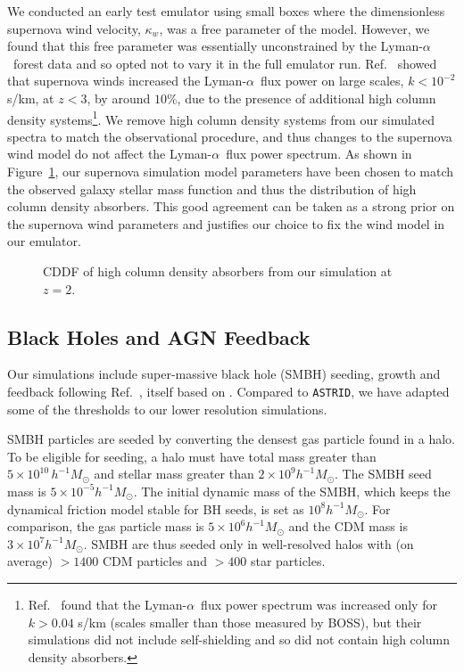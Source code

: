 \documentclass[a4paper,11pt]{article}
\newcommand{\Lya}{Lyman-$\alpha$}
\newcommand{\astrid}{\texttt{ASTRID}}
\begin{document}
We conducted an early test emulator using small boxes where the dimensionless supernova wind velocity, $\kappa_w$, was a free parameter of the model. However, we found that this free parameter was essentially unconstrained by the \Lya~forest data and so opted not to vary it in the full emulator run. Ref.~\cite{Bolton:2017} showed that supernova winds increased the \Lya~flux power on large scales, $k < 10^{-2}$ s/km, at $z < 3$, by around $10\%$, due to the presence of additional high column density systems\footnote{Ref.~\cite{Viel:2013} found that the \Lya~flux power spectrum was increased only for $ k > 0.04$ s/km (scales smaller than those measured by BOSS), but their simulations did not include self-shielding and so did not contain high column density absorbers.}. We remove high column density systems from our simulated spectra to match the observational procedure, and thus changes to the supernova wind model do not affect the \Lya~flux power spectrum. As shown in Figure~\ref{fig:DLACDDF}, our supernova simulation model parameters have been chosen to match the observed galaxy stellar mass function and thus the distribution of high column density absorbers. This good agreement can be taken as a strong prior on the supernova wind parameters and justifies our choice to fix the wind model in our emulator.

\begin{figure}
 \caption{CDDF of high column density absorbers from our simulation at $z=2$.}
 \label{fig:DLACDDF}
\end{figure}

\subsection{Black Holes and AGN Feedback}
\label{sec:agn}

Our simulations include super-massive black hole (SMBH) seeding, growth and feedback following Ref.~\cite{Ni:2022}, itself based on \cite{Feng:2016,SDH2005,DSH2005}. Compared to \astrid, we have adapted some of the thresholds to our lower resolution simulations.

SMBH particles are seeded by converting the densest gas particle found in a halo. To be eligible for seeding, a halo must have total mass greater than $5\times 10^{10}\,h^{-1}M_\odot$ and stellar mass greater than $2 \times 10^9 h^{-1} M_\odot$. The SMBH seed mass is $5 \times 10^{-5} h^{-1} M_\odot$. The initial dynamic mass of the SMBH, which keeps the dynamical friction model stable for BH seeds, is set as $10^{8} h^{-1} M_\odot$. For comparison, the gas particle mass is $5 \times 10^6 h^{-1} M_\odot$ and the CDM mass is $ 3 \times 10^7 h^{-1} M_\odot$. SMBH are thus seeded only in well-resolved halos with (on average) $> 1400$ CDM particles and $>400$ star particles.
\end{document}
